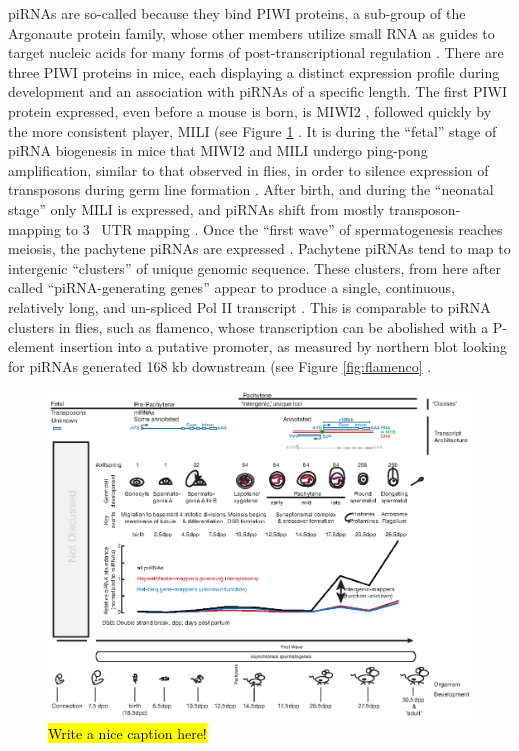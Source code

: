       piRNAs are so-called because they bind PIWI proteins, a sub-group of the Argonaute protein family, whose other members utilize small RNA as guides to target nucleic acids for many forms of post-transcriptional regulation \citep{Siomi2011}. There are three PIWI proteins in mice, each displaying a distinct expression profile during development and an association with piRNAs of a specific length. The first PIWI protein expressed, even before a mouse is born, is MIWI2 \citep{Carmell2007}, followed quickly by the more consistent player, MILI (see Figure \ref{fig:Mammalian piRNA classes} \citep{Kuramochi-Miyagawa2004, Aravin2006}. It is during the ``fetal'' stage of piRNA biogenesis in mice that MIWI2 and MILI undergo ping-pong amplification, similar to that observed in flies, in order to silence expression of transposons during germ line formation \citep{Brennecke2007, Kuramochi-Miyagawa2008}. After birth, and during the ``neonatal stage'' only MILI is expressed, and piRNAs shift from mostly transposon-mapping to 3\textprime~ UTR mapping \citep{Robine2009}. Once the ``first wave'' of spermatogenesis \citep{Oakberg1956b, Laiho2013a} reaches meiosis, the pachytene piRNAs are expressed \citep{Girard2006, Lau2006, Li2013h}. Pachytene piRNAs tend to map to intergenic ``clusters'' of unique genomic sequence. These clusters, from here after called ``piRNA-generating genes'' appear to produce a single, continuous, relatively long, and un-spliced Pol II transcript \citep{Li2013h}. This is comparable to piRNA clusters in flies, such as flamenco, whose transcription can be abolished with a P-element insertion into a putative promoter, as measured by northern blot looking for piRNAs generated 168 kb downstream (see Figure \ref{fig:flamenco} \citep{Brennecke2007}. 

      \begin{figure}[htbp] %
      \centering 
      \includegraphics{Figures/Intro/MammalianPiRNAClassesOverTime.eps}
      \caption[Different Classes of mammalian piRNAs]
      {
        \hl{Write a nice caption here!}
        } \label{fig:Mammalian piRNA classes}
      \end{figure}


